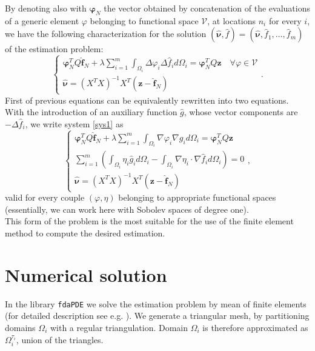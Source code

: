 By denoting also with $\bm{\varphi}_N$ the vector obtained by concatenation of
the evaluations of a generic element $\varphi$ belonging to functional space
$\mathcal{V}$, at locations $n_i$ for every $i$, we have the following
characterization for the solution $\left(\hat{\bm{\nu}} , \hat{f} \right) =
	\left(\hat{\bm{\nu}} , \hat{f}_1, \dots, \hat{f}_m \right)$ of the estimation
problem:
\begin{equation}
	\begin{cases}
		\bm{\varphi}_N^T Q \hat{\bm{f}}_N + \lambda \sum_{i = 1}^m \int_{\Omega_i}\Delta \varphi_i \Delta \hat{f}_i  d\Omega_i = \bm{\varphi}_N^T Q \bm{z} \quad \forall \varphi \in \mathcal{V} \\
		\hat{\bm{\nu}}=\left(X^TX\right)^{-1}X^T(\bm{z}-\hat{\bm{f}}_N)
	\end{cases}
	. \label{sys1}
\end{equation}
First of previous equations can be equivalently rewritten into two
equations. With the introduction of an auxiliary function $\hat{g}$, whose
vector components are $-\Delta \hat{f}_i$, we write system \ref{sys1} as
\begin{equation}
	\label{triple}
	\begin{cases}
		\bm{\varphi}_N^T Q \hat{\bm{f}}_N + \lambda \sum_{i = 1}^m \int_{\Omega_i}\nabla \varphi_i \nabla g_i d\Omega_i = \bm{\varphi}_N^T Q \bm{z} \\
		\sum_{i=1}^{m}\left(\int_{\Omega_i}\eta_i \hat{g}_i d\Omega_i -\int_{\Omega_i}\nabla \eta_i \cdot \nabla \hat{f}_i d\Omega_i\right)=0       \\
		\hat{\bm{\nu}}=\left(X^TX\right)^{-1}X^T(\bm{z}-\hat{\bm{f}}_N)
	\end{cases}
	,
\end{equation}
valid for every couple $(\varphi,\eta)$ belonging to appropriate
functional spaces (essentially, we can work here with Sobolev spaces of degree
one).\\ This form of the problem is the most suitable for the use of the finite
element method to compute the desired estimation.

\section{Numerical solution}
\label{solution}
In the library \texttt{fdaPDE} we solve the estimation problem by mean of
finite elements (for detailed description see e.g. \cite{quarteronitosto}). We
generate a triangular mesh, by partitioning domains $\Omega_i$ with a regular
triangulation. Domain $\Omega_i$ is therefore approximated as
$\Omega_i^{\tau_i}$, union of the triangles.

